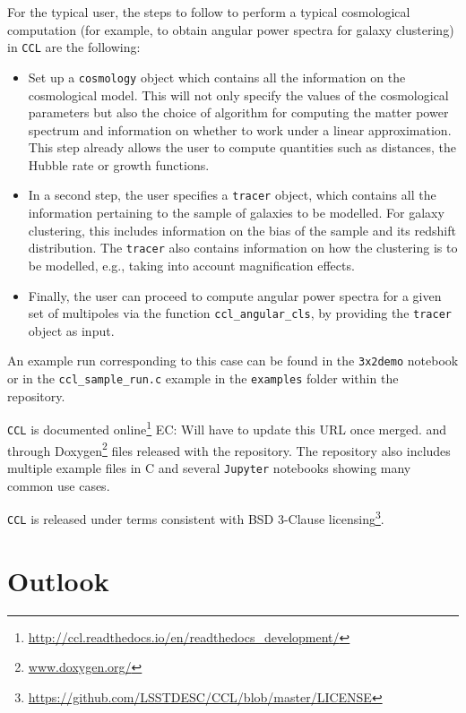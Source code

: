 \documentclass[\docopts]{\docclass}
\newcommand{\elisa}[1]{\textcolor{green!10!orange!90!}{EC: #1}}
\newcommand{\ccl}{{\tt CCL}\xspace}
\begin{document}
For the typical user, the steps to follow to perform a typical cosmological computation (for example, to obtain angular power spectra for galaxy clustering) in \ccl are the following:
\begin{itemize}
\item Set up a {\tt cosmology} object which contains all the information on the cosmological model. This will not only specify the values of the cosmological parameters but also the choice of algorithm for computing the matter power spectrum and information on whether to work under a linear approximation. This step already allows the user to compute quantities such as distances, the Hubble rate or growth functions.
\item In a second step, the user specifies a {\tt tracer} object, which contains all the information pertaining to the sample of galaxies to be modelled. For galaxy clustering, this includes information on the bias of the sample and its redshift distribution. The {\tt tracer} also contains information on how the clustering is to be modelled, e.g., taking into account magnification effects. 
\item Finally, the user can proceed to compute angular power spectra for a given set of multipoles via the function {\tt ccl\_angular\_cls}, by providing the {\tt tracer} object as input.
\end{itemize}
An example run corresponding to this case can be found in the {\tt 3x2demo} notebook or in the {\tt ccl\_sample\_run.c} example in the {\tt examples} folder within the repository.

\ccl is documented online\footnote{\url{http://ccl.readthedocs.io/en/readthedocs_development/}} \elisa{Will have to update this URL once merged.} and through Doxygen\footnote{\url{www.doxygen.org/}} files released with the repository. The repository also includes multiple example files in C and several {\tt Jupyter} notebooks showing many common use cases.

\ccl is released under terms consistent with BSD 3-Clause licensing\footnote{\url{https://github.com/LSSTDESC/CCL/blob/master/LICENSE}}.

\section{Outlook}
\label{sec:conclusion}
\end{document}
